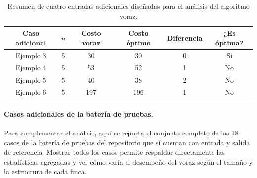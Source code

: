 \documentclass[12pt,a4paper]{article}
\begin{document}
\begin{table}[ht]
  \centering
  \small
  \begin{tabular}{cccccc}
    \toprule
    Caso adicional & \(n\) & Costo voraz & Costo \'optimo & Diferencia & ¿Es \'optima? \\
    \midrule
    Ejemplo 3 & 5 & 30 & 30 & 0 & S\'i \\
    Ejemplo 4 & 5 & 53 & 52 & 1 & No \\
    Ejemplo 5 & 5 & 40 & 38 & 2 & No \\
    Ejemplo 6 & 5 & 197 & 196 & 1 & No \\
    \bottomrule
  \end{tabular}
  \caption{Resumen de cuatro entradas adicionales dise\~nadas para el an\'alisis del algoritmo voraz.}
\end{table}

\paragraph{Casos adicionales de la bater\'ia de pruebas.}
Para complementar el an\'alisis, aqu\'i se reporta el conjunto completo de los 18 casos de la bater\'ia de pruebas del repositorio que s\'i cuentan con entrada y salida de referencia. Mostrar todos los casos permite respaldar directamente las estad\'isticas agregadas y ver c\'omo var\'ia el desempe\~no del voraz seg\'un el tama\~no y la estructura de cada finca.

\medskip
\end{document}
